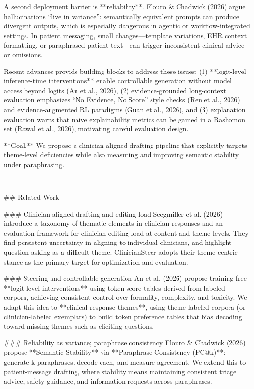 A second deployment barrier is **reliability**. Flouro & Chadwick (2026) argue hallucinations “live in variance”: semantically equivalent prompts can produce divergent outputs, which is especially dangerous in agentic or workflow-integrated settings. In patient messaging, small changes—template variations, EHR context formatting, or paraphrased patient text—can trigger inconsistent clinical advice or omissions.

Recent advances provide building blocks to address these issues: (1) **logit-level inference-time interventions** enable controllable generation without model access beyond logits (An et al., 2026), (2) evidence-grounded long-context evaluation emphasizes “No Evidence, No Score” style checks (Ren et al., 2026) and evidence-augmented RL paradigms (Guan et al., 2026), and (3) explanation evaluation warns that naive explainability metrics can be gamed in a Rashomon set (Rawal et al., 2026), motivating careful evaluation design.

**Goal.** We propose a clinician-aligned drafting pipeline that explicitly targets theme-level deficiencies while also measuring and improving semantic stability under paraphrasing.

---

## Related Work  

### Clinician-aligned drafting and editing load  
Seegmiller et al. (2026) introduce a taxonomy of thematic elements in clinician responses and an evaluation framework for clinician editing load at content and theme levels. They find persistent uncertainty in aligning to individual clinicians, and highlight question-asking as a difficult theme. ClinicianSteer adopts their theme-centric stance as the primary target for optimization and evaluation.

### Steering and controllable generation  
An et al. (2026) propose training-free **logit-level interventions** using token score tables derived from labeled corpora, achieving consistent control over formality, complexity, and toxicity. We adapt this idea to **clinical response themes**, using theme-labeled corpora (or clinician-labeled exemplars) to build token preference tables that bias decoding toward missing themes such as eliciting questions.

### Reliability as variance; paraphrase consistency  
Flouro & Chadwick (2026) propose **Semantic Stability** via **Paraphrase Consistency (PC@k)**: generate k paraphrases, decode each, and measure agreement. We extend this to patient-message drafting, where stability means maintaining consistent triage advice, safety guidance, and information requests across paraphrases.

